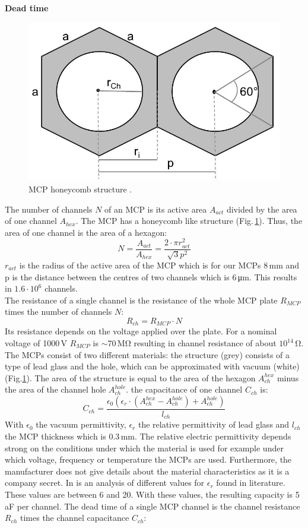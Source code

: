 		\textbf{Dead time}\\
		
		\begin{figure}[h]
			\centering
			\includegraphics[width=.4\textwidth]{Bilder/MCP_hex.jpg}
			\caption{MCP honeycomb structure \cite{Diss_Neuland}.}
			\label{fig:MCPhex} %
		\end{figure}
		The number of channels $N$ of an MCP is its active area $A_{act}$ divided by the area of one channel $A_{hex}$. The MCP has a honeycomb like structure (Fig.\,\ref{fig:MCPhex}). Thus, the area of one channel is the area of a hexagon:
		\begin{equation}
			N = \frac{A_{act}}{A_{hex}} = \frac{2\cdot\pi r^2_{act}}{\sqrt{3}p^2}
		\end{equation}
		$r_{act}$ is the radius of the active area of the MCP which is for our MCPs 8\,\si{\milli\meter} and p is the distance between the centres of two channels which is 6\,\si{\micro\meter}. This results in $1.6\cdot10^6$ channels.\\
		The resistance of a single channel is the resistance of the whole MCP plate $R_{MCP}$ times the number of channels $N$:
		\begin{equation}
			R_{ch} = R_{MCP}\cdot N
		\end{equation}
		Its resistance depends on the voltage applied over the plate. For a nominal voltage of 1000\,\si{\volt} $R_{MCP}$ is $\sim$70\,\si{\mega\ohm} resulting in channel resistance of about $10^{14}$\,\si{\ohm}.\\
		The MCPs consist of two different materials: the structure (grey) consists of a type of lead glass and the hole, which can be approximated with vacuum (white) (Fig.\ref{fig:MCPhex}). The area of the structure is equal to the area of the hexagon $A^{hex}_{ch}$ minus the area of the channel hole $A^{hole}_{ch}$. the capacitance of one channel $C_{ch}$ is:
		\begin{equation}
			C_{ch} = \frac{\epsilon_0  (\epsilon_r \cdot (A^{hex}_{ch} - A^{hole}_{ch})+ A^{hole}_{ch})}{l_{ch}}
		\end{equation}
		With $\epsilon_0$ the vacuum permittivity, $\epsilon_r$ the relative permittivity of lead glass and $l_{ch}$ the MCP thickness which is 0.3\,\si{\milli\meter}. The relative electric permittivity depends strong on the conditions under which the material is used for example under which voltage, frequency or temperature the MCPs are used. Furthermore, the manufacturer does not give details about the material characteristics as it is a company secret. In \cite{Diss_Neuland} is an analysis of different values for $\epsilon_r$ found in literature. These values are between 6 and 20. With these values, the resulting capacity is 5\,\si{\atto\farad} per channel. The dead time of a single MCP channel is the channel resistance $R_{ch}$ times the channel capacitance $C_{ch}$:
